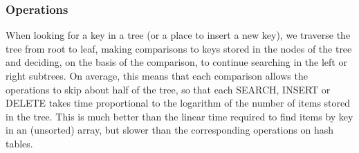 \documentclass[../main.tex]{subfiles}
\begin{document}





\subsubsection{Operations}
When looking for a key in a tree (or a place to insert a new key), we traverse the tree from root to leaf, making comparisons to keys stored in the nodes of the tree and deciding, on the basis of the comparison, to continue searching in the left or right subtrees. On average, this means that each comparison allows the operations to skip about half of the tree, so that each SEARCH, INSERT or DELETE takes time proportional to the logarithm of the number of items stored in the tree. This is much better than the linear time required to find items by key in an (unsorted) array, but slower than the corresponding operations on hash tables. 

\end{document}
